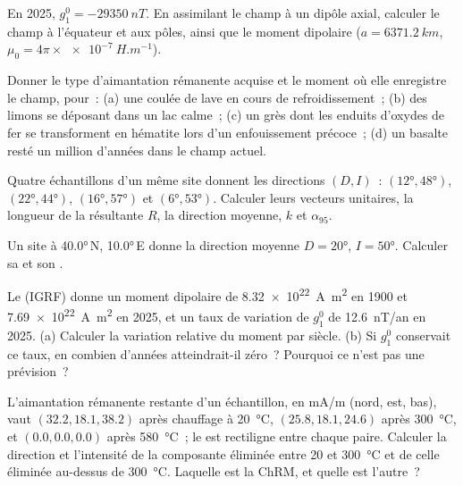 \begin{exercise}[$\star$]\label{exo:b3:palaeomagnetism:3}
En 2025, $g_1^0 = \qty{-29350}{nT}$. En assimilant le champ à un dipôle axial,
calculer le champ à l'équateur et aux pôles, ainsi que le moment dipolaire
($a = \qty{6371.2}{km}$, $\mu_0 = 4\pi\times\qty{e-7}{H.m^{-1}}$).
\end{exercise}

\begin{exercise}[$\star$]\label{exo:b3:palaeomagnetism:4}
Donner le type d'aimantation rémanente acquise et le moment où elle enregistre le champ, pour~: (a) une
coulée de lave en cours de refroidissement~; (b) des limons se déposant dans un lac calme~; (c) un grès
dont les enduits d'oxydes de fer se transforment en hématite lors d'un enfouissement précoce~;
(d) un basalte resté un million d'années dans le champ actuel.
\end{exercise}

\begin{exercise}[$\star\star$]\label{exo:b3:palaeomagnetism:5}
Quatre échantillons d'un même site donnent les directions $(D, I)$~: $(\ang{12}, \ang{48})$,
$(\ang{22}, \ang{44})$, $(\ang{16}, \ang{57})$ et $(\ang{6}, \ang{53})$.
Calculer leurs vecteurs unitaires, la longueur de la résultante $R$, la direction moyenne, $k$
et $\alpha_{95}$.
\end{exercise}

\begin{exercise}[$\star\star$]\label{exo:b3:palaeomagnetism:6}
Un site à \ang{40.0}\,N, \ang{10.0}\,E donne la direction moyenne $D = \ang{20}$,
$I = \ang{50}$. Calculer sa  et son .
\end{exercise}

\begin{exercise}[$\star\star$]\label{exo:b3:palaeomagnetism:7}
Le  (IGRF) donne un moment dipolaire de \qty{8.32e22}{A.m^2} en 1900 et
\qty{7.69e22}{A.m^2} en 2025, et un taux de variation de $g_1^0$ de
\qty{+12.6}{nT/an} en 2025. (a) Calculer la variation relative du moment par
siècle. (b) Si $g_1^0$ conservait ce taux, en combien d'années atteindrait-il zéro~?
Pourquoi ce n'est pas une prévision~?
\end{exercise}

\begin{exercise}[$\star\star$]\label{exo:b3:palaeomagnetism:8}
L'aimantation rémanente restante d'un échantillon, en \unit{mA/m} (nord, est, bas), vaut
$(32.2, 18.1, 38.2)$ après chauffage à \qty{20}{\celsius}, $(25.8, 18.1, 24.6)$
après \qty{300}{\celsius}, et $(0.0, 0.0, 0.0)$ après \qty{580}{\celsius}~; le
 est rectiligne entre chaque paire. Calculer la direction et
l'intensité de la composante éliminée entre 20 et \qty{300}{\celsius} et de
celle éliminée au-dessus de \qty{300}{\celsius}. Laquelle est la ChRM, et quelle est
l'autre~?
\end{exercise}

